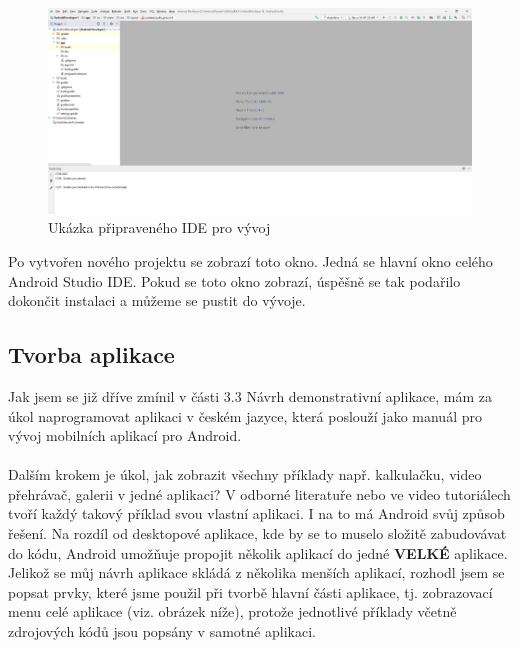 \documentclass{vskpou} %
\begin{document}
 \begin{figure}[h!]
\centering
\includegraphics[scale=0.5]{images/18.jpg}
\caption{Ukázka připraveného IDE pro vývoj}
\label{18}
\end{figure}

Po vytvořen nového projektu se zobrazí toto okno. Jedná se hlavní okno celého Android Studio IDE. Pokud se toto okno zobrazí, úspěšně se tak podařilo dokončit instalaci a můžeme se pustit do vývoje.



\subsection{Tvorba aplikace}
Jak jsem se již dříve zmínil v části 3.3 Návrh demonstrativní aplikace, mám za úkol naprogramovat aplikaci v českém jazyce, která poslouží jako manuál pro vývoj mobilních aplikací pro Android.\\
\\
Dalším krokem je úkol, jak zobrazit všechny příklady např. kalkulačku, video přehrávač, galerii v jedné aplikaci? V odborné literatuře nebo ve video tutoriálech tvoří každý takový příklad svou vlastní aplikaci. I na to má Android svůj způsob řešení. Na rozdíl od desktopové aplikace, kde by se to muselo složitě zabudovávat do kódu, Android umožňuje propojit několik aplikací do jedné \textbf{VELKÉ} aplikace. Jelikož se můj návrh aplikace skládá z několika menších aplikací, rozhodl jsem se popsat prvky, které jsme použil při tvorbě hlavní části aplikace, tj. zobrazovací menu celé aplikace (viz. obrázek níže), protože jednotlivé příklady včetně zdrojových kódů jsou popsány v samotné aplikaci.
\end{document}
